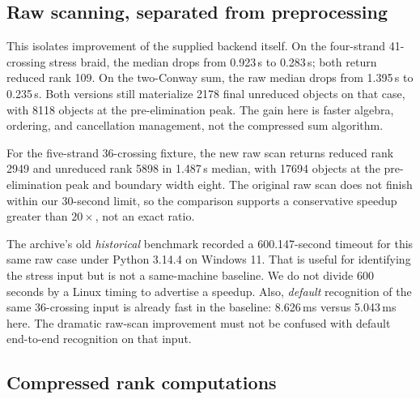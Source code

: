 \documentclass[11pt,a4paper]{article}
\theoremstyle{definition}\newtheorem{remark}[theorem]{Remark}
\begin{document}
\subsection{Raw scanning, separated from preprocessing}
\begin{table}[htbp]
\centering\small

\caption{Raw Khovanov scans: no Reidemeister reduction, no Jones/Alexander
filter, and no connected-sum factorization. Both completed versions return the
same reduced ranks.}
\label{tab:scan}
\end{table}

This isolates improvement of the supplied backend itself. On the four-strand
41-crossing stress braid, the median drops from 0.923\,s to 0.283\,s; both
return reduced rank 109. On the two-Conway sum, the raw median drops from
1.395\,s to 0.235\,s. Both versions still materialize 2178 final unreduced
objects on that case, with 8118 objects at the pre-elimination peak. The gain
here is faster algebra, ordering, and cancellation management, not the compressed
sum algorithm.

For the five-strand 36-crossing fixture, the new raw scan returns reduced rank
2949 and unreduced rank 5898 in 1.487\,s median, with 17694 objects at the
pre-elimination peak and boundary width eight. The original raw scan does not
finish within our 30-second limit, so the comparison supports a conservative
speedup greater than $20\times$, not an exact ratio.

The archive's old \emph{historical} benchmark recorded a 600.147-second timeout
for this same raw case under Python 3.14.4 on Windows 11. That is useful for
identifying the stress input but is not a same-machine baseline. We do not divide
600 seconds by a Linux timing to advertise a speedup. Also, \emph{default}
recognition of the same 36-crossing input is already fast in the baseline:
8.626\,ms versus 5.043\,ms here. The dramatic raw-scan improvement must not be
confused with default end-to-end recognition on that input.

\subsection{Compressed rank computations}
\begin{table}[htbp]
\centering\small

\caption{Complete reduced-rank and homological-degree computations using the
validated factorization. ``Peak factor objects'' is the largest pre-elimination
object count of any individual factor scan, not total process memory.}
\label{tab:factored}
\end{table}
\end{document}
